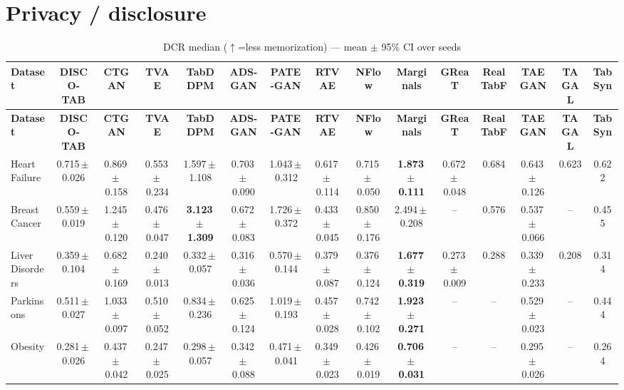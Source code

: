 \documentclass[8pt]{extarticle}
\begin{document}
\section*{Privacy / disclosure}
\begin{longtable}{l*{14}{c}}
\caption{DCR median ($\uparrow$=less memorization) --- mean $\pm$ 95\% CI over seeds}\\
\toprule
\textbf{Dataset} & \textbf{DISCO-TAB} & \textbf{CTGAN} & \textbf{TVAE} & \textbf{TabDDPM} & \textbf{ADS-GAN} & \textbf{PATE-GAN} & \textbf{RTVAE} & \textbf{NFlow} & \textbf{Marginals} & \textbf{GReaT} & \textbf{RealTabF} & \textbf{TAEGAN} & \textbf{TAGAL} & \textbf{TabSyn} \\
\midrule
\endfirsthead
\toprule
\textbf{Dataset} & \textbf{DISCO-TAB} & \textbf{CTGAN} & \textbf{TVAE} & \textbf{TabDDPM} & \textbf{ADS-GAN} & \textbf{PATE-GAN} & \textbf{RTVAE} & \textbf{NFlow} & \textbf{Marginals} & \textbf{GReaT} & \textbf{RealTabF} & \textbf{TAEGAN} & \textbf{TAGAL} & \textbf{TabSyn} \\
\midrule
\endhead
\bottomrule
\endfoot
Heart Failure & 0.715\,$\pm$\,0.026 & 0.869\,$\pm$\,0.158 & 0.553\,$\pm$\,0.234 & 1.597\,$\pm$\,1.108 & 0.703\,$\pm$\,0.090 & 1.043\,$\pm$\,0.312 & 0.617\,$\pm$\,0.114 & 0.715\,$\pm$\,0.050 & \textbf{1.873\,$\pm$\,0.111} & 0.672\,$\pm$\,0.048 & 0.684 & 0.643\,$\pm$\,0.126 & 0.623 & 0.622 \\
Breast Cancer & 0.559\,$\pm$\,0.019 & 1.245\,$\pm$\,0.120 & 0.476\,$\pm$\,0.047 & \textbf{3.123\,$\pm$\,1.309} & 0.672\,$\pm$\,0.083 & 1.726\,$\pm$\,0.372 & 0.433\,$\pm$\,0.045 & 0.850\,$\pm$\,0.176 & 2.494\,$\pm$\,0.208 & -- & 0.576 & 0.537\,$\pm$\,0.066 & -- & 0.455 \\
Liver Disorders & 0.359\,$\pm$\,0.104 & 0.682\,$\pm$\,0.169 & 0.240\,$\pm$\,0.013 & 0.332\,$\pm$\,0.057 & 0.316\,$\pm$\,0.036 & 0.570\,$\pm$\,0.144 & 0.379\,$\pm$\,0.087 & 0.376\,$\pm$\,0.124 & \textbf{1.677\,$\pm$\,0.319} & 0.273\,$\pm$\,0.009 & 0.288 & 0.339\,$\pm$\,0.233 & 0.208 & 0.314 \\
Parkinsons & 0.511\,$\pm$\,0.027 & 1.033\,$\pm$\,0.097 & 0.510\,$\pm$\,0.052 & 0.834\,$\pm$\,0.236 & 0.625\,$\pm$\,0.124 & 1.019\,$\pm$\,0.193 & 0.457\,$\pm$\,0.028 & 0.742\,$\pm$\,0.102 & \textbf{1.923\,$\pm$\,0.271} & -- & -- & 0.529\,$\pm$\,0.023 & -- & 0.444 \\
Obesity & 0.281\,$\pm$\,0.026 & 0.437\,$\pm$\,0.042 & 0.247\,$\pm$\,0.025 & 0.298\,$\pm$\,0.057 & 0.342\,$\pm$\,0.088 & 0.471\,$\pm$\,0.041 & 0.349\,$\pm$\,0.023 & 0.426\,$\pm$\,0.019 & \textbf{0.706\,$\pm$\,0.031} & -- & -- & 0.295\,$\pm$\,0.026 & -- & 0.264 \\

\end{longtable}
\end{document}
